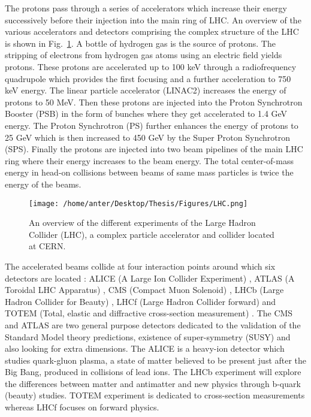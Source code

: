 The protons pass through a series of accelerators which increase their energy successively before their injection into the main ring of LHC. An overview of the various accelerators and detectors comprising the complex structure of the LHC is shown in Fig.~\ref{fig:LHC}. A bottle of hydrogen gas is the source of protons. The stripping of electrons from hydrogen gas atoms using an electric field yields protons. These protons are accelerated up to 100 keV through a radiofrequency quadrupole which provides the first focusing and a further acceleration to 750 keV energy. The linear particle accelerator (LINAC2) increases the energy of protons to 50 MeV. Then these protons are injected into the Proton Synchrotron Booster (PSB) in the form of bunches where they get accelerated to 1.4 GeV energy. The Proton Synchrotron (PS) further enhances the energy of protons to 25 GeV which is then increased to 450 GeV by the Super Proton Synchrotron (SPS). Finally the protons are injected into two beam pipelines of the main LHC ring where their energy increases to the beam energy. The total center-of-mass energy in head-on collisions between beams of same mass particles is twice the energy of the beams. 

\begin{figure}[!h]
 \begin{center} 
 \hspace*{-12mm}
 \vspace{4mm}
 \texttt{[image: /home/anter/Desktop/Thesis/Figures/LHC.png]}\\
 \vspace*{5mm}
 \caption[An overview of the different experiments of the Large Hadron Collider (LHC), a complex particle accelerator and collider located at CERN.]{An overview of the different experiments of the Large Hadron Collider (LHC), a complex particle accelerator and collider located at CERN\footnotemark.}
 \label{fig:LHC}
 \end{center}
\end{figure}

The accelerated beams collide at four interaction points around which six detectors are located : ALICE (A Large Ion Collider Experiment) \cite{Aamodt:2008zz}, ATLAS (A Toroidal LHC Apparatus) \cite{Aad:2008zzm}, CMS (Compact Muon Solenoid) \cite{Chatrchyan:2008aa,Bayatian:2006nff,Ball:2007zza}, LHCb (Large Hadron Collider for Beauty) \cite{Alves:2008zz}, LHCf (Large Hadron Collider forward)\cite{Adriani:2008zz} and TOTEM (Total, elastic and diffractive cross-section measurement) \cite{Anelli:2008zza}. The CMS and ATLAS are two general purpose detectors dedicated to the validation of the Standard Model theory predictions, existence of super-symmetry (SUSY) and also looking for extra dimensions. The ALICE is a heavy-ion detector which studies quark-gluon plasma, a state of matter believed to be present just after the Big Bang, produced in collisions of lead ions. The LHCb experiment will explore the differences between matter and antimatter and new physics through b-quark (beauty) studies. TOTEM experiment is dedicated to cross-section measurements whereas LHCf focuses on forward physics. 

